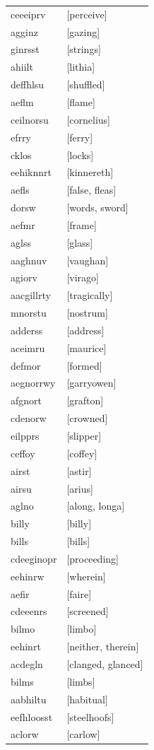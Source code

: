 \documentclass{article}
\begin{document}
\begin{tabular}{ll}
ceeeiprv & [perceive] \\
agginz & [gazing] \\
ginrsst & [strings] \\
ahiilt & [lithia] \\
deffhlsu & [shuffled] \\
aeflm & [flame] \\
ceilnorsu & [cornelius] \\
efrry & [ferry] \\
cklos & [locks] \\
eehiknnrt & [kinnereth] \\
aefls & [false, fleas] \\
dorsw & [words, sword] \\
aefmr & [frame] \\
aglss & [glass] \\
aaghnuv & [vaughan] \\
agiorv & [virago] \\
aacgillrty & [tragically] \\
mnorstu & [nostrum] \\
adderss & [address] \\
aceimru & [maurice] \\
defmor & [formed] \\
aegnorrwy & [garryowen] \\
afgnort & [grafton] \\
cdenorw & [crowned] \\
eilpprs & [slipper] \\
ceffoy & [coffey] \\
airst & [astir] \\
airsu & [arius] \\
aglno & [along, longa] \\
billy & [billy] \\
bills & [bills] \\
cdeeginopr & [proceeding] \\
eehinrw & [wherein] \\
aefir & [faire] \\
cdeeenrs & [screened] \\
bilmo & [limbo] \\
eehinrt & [neither, therein] \\
acdegln & [clanged, glanced] \\
bilms & [limbs] \\
aabhiltu & [habitual] \\
eefhloosst & [steelhoofs] \\
aclorw & [carlow] \\

\end{tabular}
\end{document}
